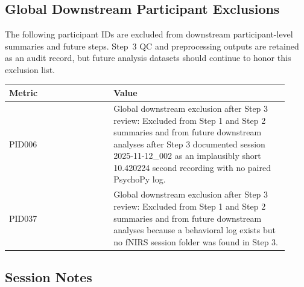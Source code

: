\documentclass[11pt]{article}
\begin{document}
\subsection*{Global Downstream Participant Exclusions}
The following participant IDs are excluded from downstream participant-level summaries and future steps. Step~3 QC and preprocessing outputs are retained as an audit record, but future analysis datasets should continue to honor this exclusion list.
\begin{tabular}{p{0.34\linewidth}p{0.58\linewidth}}
\toprule
Metric & Value\\
\midrule
PID006 & Global downstream exclusion after Step 3 review: Excluded from Step 1 and Step 2 summaries and from future downstream analyses after Step 3 documented session 2025-11-12\_002 as an implausibly short 10.420224 second recording with no paired PsychoPy log.\\
PID037 & Global downstream exclusion after Step 3 review: Excluded from Step 1 and Step 2 summaries and from future downstream analyses because a behavioral log exists but no fNIRS session folder was found in Step 3.\\
\bottomrule
\end{tabular}
\subsection*{Session Notes}






































\end{document}
